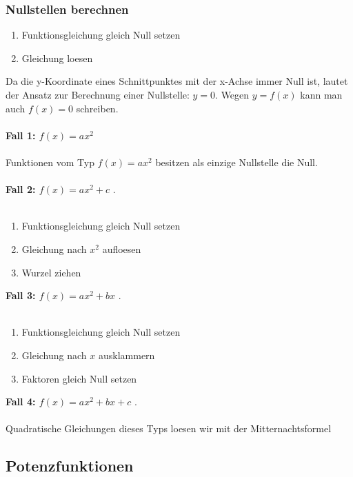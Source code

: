 \begin{multicols}{2}
    \subsubsection{Nullstellen berechnen}
    \begin{enumerate}
        \item Funktionsgleichung gleich Null setzen
        \item Gleichung loesen
    \end{enumerate}
    Da die y-Koordinate eines Schnittpunktes mit der x-Achse immer Null ist, lautet der Ansatz zur Berechnung einer Nullstelle: $y = 0$. Wegen $y = f(x)$ kann man auch $f(x) = 0$ schreiben. \\~\\
    \textbf{Fall 1: $f(x) = ax^2$} \\~\\
    Funktionen vom Typ $f(x) = ax^2$ besitzen als einzige Nullstelle die Null. \\~\\
    \textbf{Fall 2: $f(x) = ax^2 + c$} . \\~\\
    \begin{enumerate}
        \item     Funktionsgleichung gleich Null setzen
        \item     Gleichung nach $x^2$ aufloesen
        \item     Wurzel ziehen
    \end{enumerate}

    \textbf{Fall 3: $f(x) = ax^2 + bx$} . \\~\\
    \begin{enumerate}
        \item     Funktionsgleichung gleich Null setzen
        \item     Gleichung nach $x$ ausklammern
        \item     Faktoren gleich Null setzen
    \end{enumerate}

    \textbf{Fall 4: $f(x) = ax^2 + bx + c$} . \\~\\
    Quadratische Gleichungen dieses Typs loesen wir mit der Mitternachtsformel


    \subsection{Potenzfunktionen}
    \vspace{-4mm}

\end{multicols}
